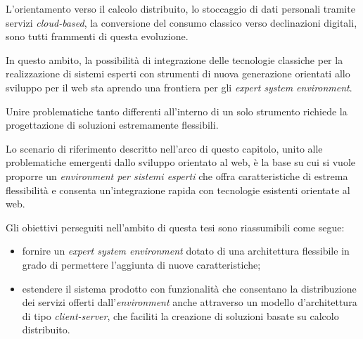 L'orientamento verso il calcolo distribuito, lo stoccaggio di dati personali tramite servizi \emph{cloud-based}, la conversione del consumo classico verso declinazioni digitali, sono tutti frammenti di questa evoluzione.

In questo ambito, la possibilità di integrazione delle tecnologie classiche per la realizzazione di sistemi esperti con strumenti di nuova generazione orientati allo sviluppo per il web sta aprendo una frontiera per gli \emph{expert system environment}.

Unire problematiche tanto differenti all'interno di un solo strumento richiede la progettazione di soluzioni estremamente flessibili.

Lo scenario di riferimento descritto nell'arco di questo capitolo, unito alle problematiche emergenti dallo sviluppo orientato al web, è la base su cui si vuole proporre un \emph{environment per sistemi esperti} che offra caratteristiche di estrema flessibilità e consenta un'integrazione rapida con tecnologie esistenti orientate al web.

Gli obiettivi perseguiti nell'ambito di questa tesi sono riassumibili come segue:
\begin{itemize}
	\item fornire un \emph{expert system environment} dotato di una architettura flessibile in grado di permettere l'aggiunta di nuove caratteristiche;
	\item estendere il sistema prodotto con funzionalità che consentano la distribuzione dei servizi offerti dall'\emph{environment} anche attraverso un modello d'architettura di tipo \emph{client-server}, che faciliti la creazione di soluzioni basate su calcolo distribuito.
\end{itemize}


